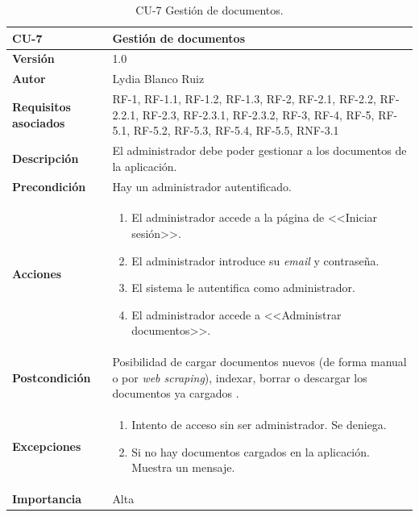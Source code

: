 \begin{table}[p]
	\centering
	\begin{tabularx}{\linewidth}{ p{} p{} }
		\toprule
		\textbf{CU-7}    & \textbf{ Gestión de documentos}\\
		\toprule
		\textbf{Versión}              & 1.0    \\
		\textbf{Autor}                & Lydia Blanco Ruiz \\
		\textbf{Requisitos asociados} & RF-1, RF-1.1, RF-1.2, RF-1.3, RF-2, RF-2.1, RF-2.2, RF-2.2.1, RF-2.3, RF-2.3.1, RF-2.3.2, RF-3, RF-4, RF-5, RF-5.1, RF-5.2, RF-5.3, RF-5.4, RF-5.5, RNF-3.1 \\
		\textbf{Descripción}          & El administrador debe poder gestionar a los documentos de la aplicación. \\
		\textbf{Precondición}         & Hay un administrador autentificado. \\
		\textbf{Acciones}             &
		\begin{enumerate}
			\def\labelenumi{\arabic{enumi}.}
			\tightlist
			\item El administrador accede a la página de <<Iniciar sesión>>.
			\item El administrador introduce su \textit{email} y contraseña.
			\item El sistema le autentifica como administrador.
			\item El administrador accede a <<Administrar documentos>>.
		\end{enumerate}\\
		\textbf{Postcondición}        & Posibilidad de cargar documentos nuevos (de forma manual o por \textit{web scraping}), indexar, borrar o descargar los documentos ya cargados . \\
		\textbf{Excepciones}          & 
		\begin{enumerate}
			\def\labelenumi{\arabic{enumi}.}
			\tightlist
			\item Intento de acceso sin ser administrador. Se deniega.
			\item Si no hay documentos cargados en la aplicación. Muestra un mensaje.
		\end{enumerate}\\
		\textbf{Importancia}          & Alta  \\
		\bottomrule
	\end{tabularx}
	\caption{CU-7 Gestión de documentos.}
\end{table}


